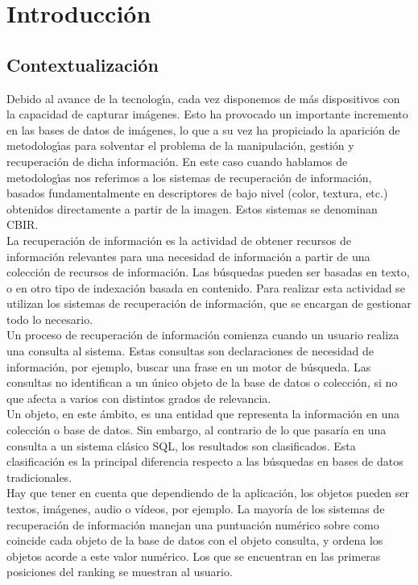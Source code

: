 \chapter{Introducción}
\label{cap:introduccion}

\section{Contextualización}

Debido al avance de la tecnologı́a, cada vez disponemos de más dispositivos con la capacidad de capturar imágenes. Esto ha provocado un importante incremento en las bases de datos de imágenes, lo que a su vez ha propiciado la aparición de metodologı́as para solventar el problema de la manipulación, gestión y recuperación de dicha información. En este caso cuando hablamos de metodologı́as nos referimos a los sistemas de recuperación de información, basados fundamentalmente en descriptores de bajo nivel (color, textura, etc.) obtenidos directamente a partir de la imagen. Estos sistemas se denominan CBIR.\\

La recuperación de información es la actividad de obtener recursos de información relevantes para una necesidad de información a partir de una colección de recursos de información. Las búsquedas pueden ser basadas en texto, o en otro tipo de indexación basada en contenido. Para realizar esta actividad se utilizan los sistemas de recuperación de información, que se encargan de gestionar todo lo necesario.\\

Un proceso de recuperación de información comienza cuando un usuario realiza una consulta al sistema. Estas consultas son declaraciones de necesidad de información, por ejemplo, buscar una frase en un motor de búsqueda. Las consultas no identifican a un único objeto de la base de datos o colección, si no que afecta a varios con distintos grados de relevancia.\\

Un objeto, en este ámbito, es una entidad que representa la información en una colección o base de datos. Sin embargo, al contrario de lo que pasaría en una consulta a un sistema clásico SQL, los resultados son clasificados. Esta clasificación es la principal diferencia respecto a las búsquedas en bases de datos tradicionales.\\

Hay que tener en cuenta que dependiendo de la aplicación, los objetos pueden ser textos, imágenes, audio o vídeos, por ejemplo. La mayoría de los sistemas de recuperación de información manejan una puntuación numérico sobre como coincide cada objeto de la base de datos con el objeto consulta, y ordena los objetos acorde a este valor numérico. Los que se encuentran en las primeras posiciones del ranking se muestran al usuario.\\

